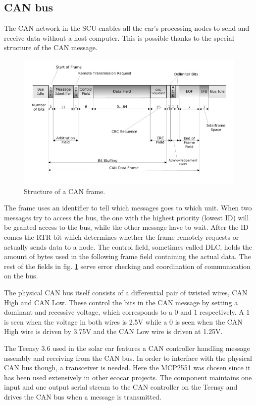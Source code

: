 \documentclass[conference]{IEEEtran}
\begin{document}
\subsection{CAN bus}
The CAN network in the SCU enables all the car's processing nodes to send and receive data without a host computer. This is possible thanks to the special structure of the CAN message.

\begin{figure}[h]
    \centering
    \includegraphics[scale=0.35]{documentation/images/detailed-can-data-frame-architecture.jpg}
    \caption{Structure of a CAN frame.}
    \label{fig:CANframe}
\end{figure}

The frame uses an identifier to tell which messages goes to which unit. When two messages try to access the bus, the one with the highest priority (lowest ID) will be granted access to the bus, while the other message have to wait. After the ID comes the RTR bit which determines whether the frame remotely requests or actually sends data to a node. The control field, sometimes called DLC, holds the amount of bytes used in the following frame field containing the actual data. The rest of the fields in fig. \ref{fig:CANframe} serve error checking and coordination of communication on the bus.

The physical CAN bus itself consists of a differential pair of twisted wires, CAN High and CAN Low. These control the bits in the CAN message by setting a dominant and recessive voltage, which corresponds to a 0 and 1 respectively. A 1 is seen when the voltage in both wires is 2.5V while a 0 is seen when the CAN High wire is driven by 3.75V and the CAN Low wire is driven at 1.25V. 

The Teensy 3.6 used in the solar car features a CAN controller handling message assembly and receiving from the CAN bus. In order to interface with the physical CAN bus though, a transceiver is needed. Here the MCP2551 was chosen since it has been used extensively in other ecocar projects. The component maintains one input and one output serial stream to the CAN controller on the Teensy and drives the CAN bus when a message is transmitted.
\end{document}
